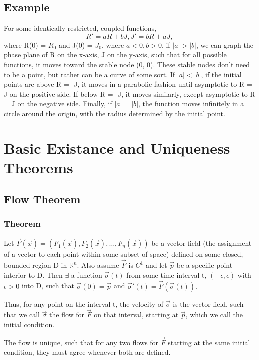 \documentclass[11 pt, twoside]{article}
\newcommand{\realn}{\mathbb{R}^n}
\begin{document}
\subsection{Example}

For some identically restricted, coupled functions, $$R' = aR + bJ, J' = bR + aJ,$$ where R(0) = $R_0$ and J(0) = $J_0$, where $a < 0, b > 0$, if $|a| > |b|$, we can graph the phase plane of R on the x-axis, J on the y-axis, such that for all possible functions, it moves toward the stable node (0, 0). These stable nodes don't need to be a point, but rather can be a curve of some sort. If $|a| < |b|$, if the initial points are above R = -J, it moves in a parabolic fashion until asymptotic to R = J on the positive side. If below R = -J, it moves similarly, except asymptotic to R = J on the negative side. Finally, if $|a| = |b|$, the function moves infinitely in a circle around the origin, with the radius determined by the initial point.

\section{Basic Existance and Uniqueness Theorems}

\subsection{Flow Theorem}
\subsubsection{Theorem} 
Let $\vec{F}(\vec{x}) = (F_1(\vec{x}), F_2(\vec{x}), \dots, F_n(\vec{x}))$ be a vector field (the assignment of a vector to each point within some subset of space) defined on some closed, bounded region D in $\realn$. Also assume $\vec{F}$ is $C^1$ and let $\vec{p}$ be a specific point interior to D. Then $\exists$ a function $\vec{\sigma}(t)$ from some time interval t, $(-\epsilon, \epsilon)$ with $\epsilon > 0$ into D, such that $\vec{\sigma}(0) = \vec{p}$ and $\vec{\sigma}'(t) = \vec{F}(\vec{\sigma}(t)).$

Thus, for any point on the interval t, the velocity of $\vec{\sigma}$ is the vector field, such that we call $\vec{\sigma}$ the flow for $\vec{F}$ on that interval, starting at $\vec{p}$, which we call the initial condition.

The flow is unique, such that for any two flows for $\vec{F}$ starting at the same initial condition, they must agree whenever both are defined.
\end{document}
